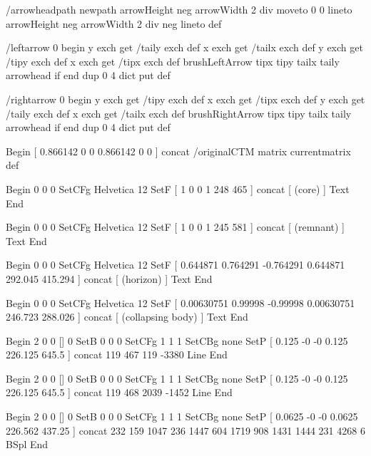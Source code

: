 /arrowheadpath {
newpath
arrowHeight neg arrowWidth 2 div moveto
0 0 lineto
arrowHeight neg arrowWidth 2 div neg lineto
} def

/leftarrow {
0 begin
y exch get /taily exch def
x exch get /tailx exch def
y exch get /tipy exch def
x exch get /tipx exch def
brushLeftArrow { tipx tipy tailx taily arrowhead } if
end
} dup 0 4 dict put def

/rightarrow {
0 begin
y exch get /tipy exch def
x exch get /tipx exch def
y exch get /taily exch def
x exch get /tailx exch def
brushRightArrow { tipx tipy tailx taily arrowhead } if
end
} dup 0 4 dict put def




Begin
[ 0.866142 0 0 0.866142 0 0 ] concat
/originalCTM matrix currentmatrix def

Begin %
0 0 0 SetCFg
Helvetica 12 SetF
[ 1 0 0 1 248 465 ] concat
[
(core)
] Text
End

Begin %
0 0 0 SetCFg
Helvetica 12 SetF
[ 1 0 0 1 245 581 ] concat
[
(remnant)
] Text
End

Begin %
0 0 0 SetCFg
Helvetica 12 SetF
[ 0.644871 0.764291 -0.764291 0.644871 292.045 415.294 ] concat
[
(horizon)
] Text
End

Begin %
0 0 0 SetCFg
Helvetica 12 SetF
[ 0.00630751 0.99998 -0.99998 0.00630751 246.723 288.026 ] concat
[
(collapsing body)
] Text
End

Begin %
2 0 0 [] 0 SetB
0 0 0 SetCFg
1 1 1 SetCBg
none SetP %
[ 0.125 -0 -0 0.125 226.125 645.5 ] concat
119 467 119 -3380 Line
End

Begin %
2 0 0 [] 0 SetB
0 0 0 SetCFg
1 1 1 SetCBg
none SetP %
[ 0.125 -0 -0 0.125 226.125 645.5 ] concat
119 468 2039 -1452 Line
End

Begin %
2 0 0 [] 0 SetB
0 0 0 SetCFg
1 1 1 SetCBg
none SetP %
[ 0.0625 -0 -0 0.0625 226.562 437.25 ] concat
232 159
1047 236
1447 604
1719 908
1431 1444
231 4268
6 BSpl
End

